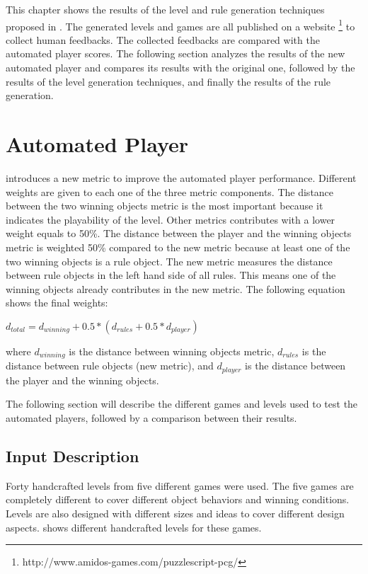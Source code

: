 This chapter shows the results of the level and rule generation techniques proposed in . The generated levels and games are all published on a website \footnote{http://www.amidos-games.com/puzzlescript-pcg/} to collect human feedbacks. The collected feedbacks are compared with the automated player scores. The following section analyzes the results of the new automated player and compares its results with the original one, followed by the results of the level generation techniques, and finally the results of the rule generation.\\\par

\section{Automated Player}
 introduces a new metric to improve the automated player performance. Different weights are given to each one of the three metric components. The distance between the two winning objects metric is the most important because it indicates the playability of the level. Other metrics contributes with a lower weight equals to 50\%. The distance between the player and the winning objects metric is weighted 50\% compared to the new metric because at least one of the two winning objects is a rule object. The new metric measures the distance between rule objects in the left hand side of all rules. This means one of the winning objects already contributes in the new metric. The following equation shows the final weights:
\begin{center}$d_{total} = d_{winning} + 0.5 * (d_{rules} + 0.5 * d_{player})$\end{center}
where $d_{winning}$ is the distance between winning objects metric, $d_{rules}$ is the distance between rule objects (new metric), and $d_{player}$ is the distance between the player and the winning objects.\\\par

The following section will describe the different games and levels used to test the automated players, followed by a comparison between their results.

\subsection{Input Description}
Forty handcrafted levels from five different games were used. The five games are completely different to cover different object behaviors and winning conditions. Levels are also designed with different sizes and ideas to cover different design aspects.  shows different handcrafted levels for these games.

